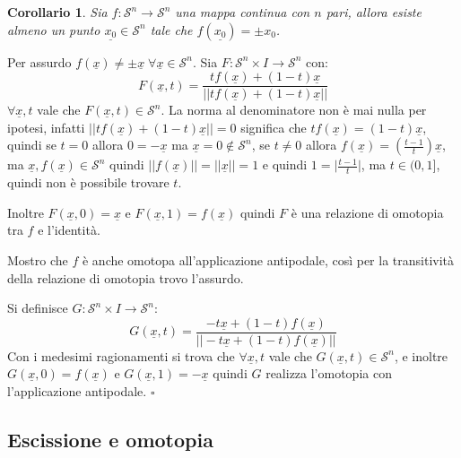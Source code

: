 \documentclass[10pt, twoside=false, x11names]{scrbook}
\newtheorem{corollary}[theorem]{Corollario}
\newenvironment{proof}{{\textbf{Dimostrazione}:}}{\hfill $\square$}
\newcommand{\Sph}[1][]{\mathcal{S}^#1}
\renewcommand{\vec}[1]{\underline{#1}}
\begin{document}
\begin{corollary}
  Sia $ f \colon \Sph{n} \to \Sph{n} $ una mappa continua con $ n $ pari, allora esiste almeno
  un punto $ \vec{x_0} \in \Sph{n} $ tale che $ f(\vec{x_0}) = \pm x_0 $.
\end{corollary}
\begin{proof}
  Per assurdo $ f(\vec{x}) \not = \pm \vec{x} \; \forall \vec{x} \in \Sph{n} $. Sia $ F \colon \Sph{n} \times I \to \Sph{n} $
  con:
  \[
    F(\vec{x}, t) = \frac{t f(\vec{x}) + (1-t)\vec{x}}{|| t f(\vec{x}) + (1-t)\vec{x} ||}
  \]
  $ \forall \vec{x}, t $ vale che $ F(\vec{x}, t) \in \Sph{n} $.
  La norma al denominatore non è mai nulla per ipotesi, infatti $ || t f(\vec{x}) + (1-t) \vec{x} || = 0 $
  significa che $ t f(\vec{x}) = (1-t)\vec{x} $, quindi se $ t = 0 $ allora $ 0 = - \vec{x} $ ma $ \vec{x} = 0 \not \in \Sph{n} $,
  se $ t \not = 0 $ allora $ f(\vec{x}) = \left(\frac{t-1}{t}\right)\vec{x} $, ma $ \vec{x}, f(\vec{x}) \in \Sph{n} $
  quindi $ || f(\vec{x}) || = || \vec{x} || = 1 $ e quindi $ 1 = \big \rvert \frac{t-1}{t}\big \lvert $,
  ma $ t \in (0,1] $, quindi non è possibile trovare $ t $.

  Inoltre $ F(\vec{x}, 0) = \vec{x} $ e $ F(\vec{x}, 1) = f(\vec{x}) $ quindi $ F $ è una relazione di omotopia
  tra $ f $ e l'identità.

  Mostro che $ f $ è anche omotopa all'applicazione antipodale, così per la transitività della
  relazione di omotopia trovo l'assurdo.

  Si definisce  $ G\colon \Sph{n} \times I \to \Sph{n} $:
  \[
    G(\vec{x}, t) = \frac{-t \vec{x} + (1-t)f(\vec{x})}{|| -t \vec{x} + (1-t)f(\vec{x}) ||}
  \]
  Con i medesimi ragionamenti si trova che   $ \forall \vec{x}, t $ vale che $ G(\vec{x}, t) \in \Sph{n} $, e inoltre
  $ G(\vec{x}, 0) = f(\vec{x}) $ e $ G(\vec{x}, 1) = - \vec{x} $ quindi $ G $ realizza
  l'omotopia con l'applicazione antipodale.
\end{proof}




\subsection{Escissione e omotopia}
\end{document}
